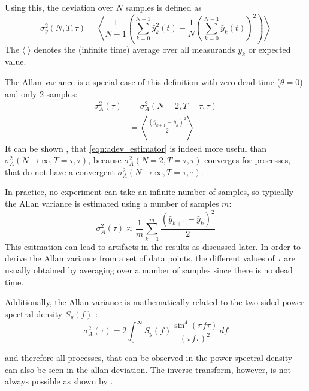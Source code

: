 Using this, the deviation over $N$ samples is defined as \cite{adev,psd_to_adev}
\begin{equation}
    \sigma_y^2(N,T,\tau) = \left\langle \frac{1}{N-1} \left(\sum _{k=0}^{N-1}\bar y_k^2(t)-\frac{1}{N}\left(\sum _{k=0}^{N-1} \bar y_k(t)\right)^2\right)\right\rangle
\end{equation}
The $\langle \; \rangle$ denotes the (infinite time) average over all measurands $y_k$ or expected value.

The Allan variance is a special case of this definition with zero dead-time ($\theta=0$) and only 2 samples:
\begin{align}
    \sigma_A^2(\tau) &= \sigma_A^2(N=2,T=\tau,\tau) \label{eqn:allan_coefficients}\\
    &= \left\langle \frac{\left(\bar y_{k+1} - \bar y_k \right)^2}{2} \right\rangle
\end{align}
It can be shown \cite{psd_to_adev}, that \ref{eqn:adev_estimator} is indeed more useful than $\sigma_A^2(N\to\infty,T=\tau,\tau)$, because $\sigma_A^2(N=2,T=\tau,\tau)$ converges for processes, that do not have a convergent $\sigma_A^2(N\to\infty,T=\tau,\tau)$.

In practice, no experiment can take an infinite number of samples, so typically the Allan variance is estimated using a number of samples $m$:
\begin{equation}
    \sigma_A^2(\tau) \approx \frac1 m \sum_{k=1}^m \frac{\left(\bar y_{k+1} - \bar y_{k} \right)^2}{2} \label{eqn:adev_estimator}
\end{equation}
This esitmation can lead to artifacts in the results as discussed later. In order to derive the Allan variance from a set of data points, the different values of $\tau$ are usually obtained by averaging over a number of samples since there is no dead time.

Additionally, the Allan variance is mathematically related to the two-sided power spectral density $S_y(f)$ \cite{psd_to_adev}:
\begin{equation}
    \sigma_A^2(\tau) = 2 \int_0^\infty S_y(f) \frac{\sin^4\left( \pi f \tau \right)}{(\pi f \tau)^2}\,df \label{eqn:psd_to_adev}
\end{equation}

and therefore all processes, that can be observed in the power spectral density can also be seen in the allan deviation. The inverse transform, however, is not always possible as shown by \citeauthor{inverse_adev} \cite{inverse_adev}.

